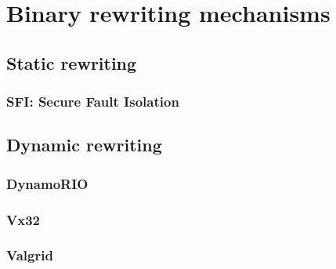 \chapter{Binary rewriting mechanisms}
\section{Static rewriting}
\subsection{SFI: Secure Fault Isolation}
\section{Dynamic rewriting}
\subsection{DynamoRIO}
\subsection{Vx32}
\subsection{Valgrid}

